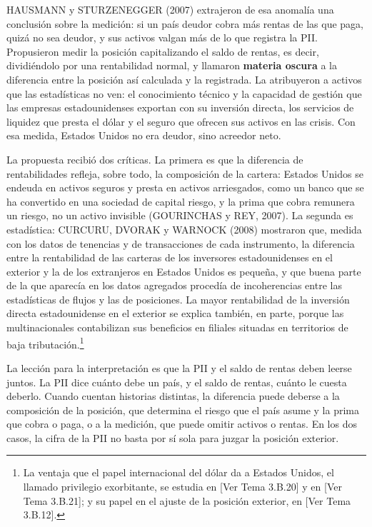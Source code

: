 \documentclass[10pt,a4paper]{article}
\newcommand{\authorfont}[1]{{\fontfamily{EBGaramond-TLF}\selectfont #1}}
\begin{document}
HAUSMANN y STURZENEGGER (2007) extrajeron de esa anomalía una conclusión sobre la medición: si un país deudor cobra más rentas de las que paga, quizá no sea deudor, y sus activos valgan más de lo que registra la PII. Propusieron medir la posición capitalizando el saldo de rentas, es decir, dividiéndolo por una rentabilidad normal, y llamaron \textbf{materia oscura} a la diferencia entre la posición así calculada y la registrada. La atribuyeron a activos que las estadísticas no ven: el conocimiento técnico y la capacidad de gestión que las empresas estadounidenses exportan con su inversión directa, los servicios de liquidez que presta el dólar y el seguro que ofrecen sus activos en las crisis. Con esa medida, Estados Unidos no era deudor, sino acreedor neto.

La propuesta recibió dos críticas. La primera es que la diferencia de rentabilidades refleja, sobre todo, la composición de la cartera: Estados Unidos se endeuda en activos seguros y presta en activos arriesgados, como un banco que se ha convertido en una sociedad de capital riesgo, y la prima que cobra remunera un riesgo, no un activo invisible (GOURINCHAS y REY, 2007). La segunda es estadística: CURCURU, DVORAK y WARNOCK (2008) mostraron que, medida con los datos de tenencias y de transacciones de cada instrumento, la diferencia entre la rentabilidad de las carteras de los inversores estadounidenses en el exterior y la de los extranjeros en Estados Unidos es pequeña, y que buena parte de la que aparecía en los datos agregados procedía de incoherencias entre las estadísticas de flujos y las de posiciones. La mayor rentabilidad de la inversión directa estadounidense en el exterior se explica también, en parte, porque las multinacionales contabilizan sus beneficios en filiales situadas en territorios de baja tributación.\footnote{%
    La ventaja que el papel internacional del dólar da a Estados Unidos, el llamado privilegio exorbitante, se estudia en [\authorfont{Ver Tema 3.B.20}] y en [\authorfont{Ver Tema 3.B.21}]; y su papel en el ajuste de la posición exterior, en [\authorfont{Ver Tema 3.B.12}].
}

La lección para la interpretación es que la PII y el saldo de rentas deben leerse juntos. La PII dice cuánto debe un país, y el saldo de rentas, cuánto le cuesta deberlo. Cuando cuentan historias distintas, la diferencia puede deberse a la composición de la posición, que determina el riesgo que el país asume y la prima que cobra o paga, o a la medición, que puede omitir activos o rentas. En los dos casos, la cifra de la PII no basta por sí sola para juzgar la posición exterior.
\end{document}
